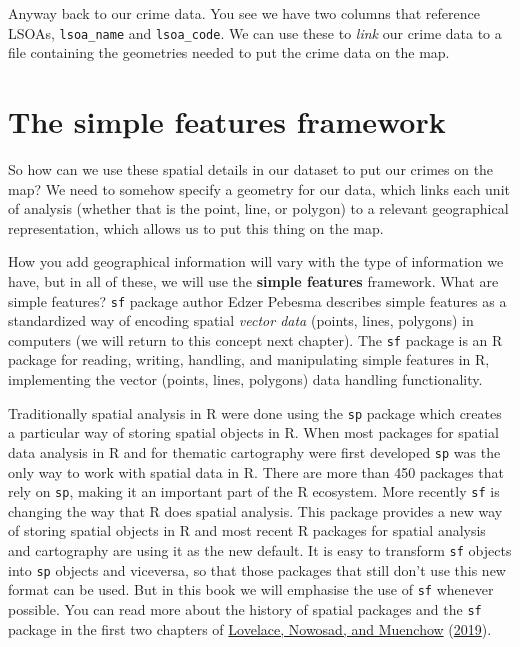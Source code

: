 \documentclass[
]{book}
\begin{document}
Anyway back to our crime data. You see we have two columns that reference LSOAs, \texttt{lsoa\_name} and \texttt{lsoa\_code}. We can use these to \emph{link} our crime data to a file containing the geometries needed to put the crime data on the map.

\hypertarget{the-simple-features-framework}{%
\section{The simple features framework}\label{the-simple-features-framework}}

So how can we use these spatial details in our dataset to put our crimes on the map? We need to somehow specify a geometry for our data, which links each unit of analysis (whether that is the point, line, or polygon) to a relevant geographical representation, which allows us to put this thing on the map.

How you add geographical information will vary with the type of information we have, but in all of these, we will use the \textbf{simple features} framework. What are simple features? \texttt{sf} package author Edzer Pebesma describes simple features as a standardized way of encoding spatial \emph{vector data} (points, lines, polygons) in computers (we will return to this concept next chapter). The \texttt{sf} package is an R package for reading, writing, handling, and manipulating simple features in R, implementing the vector (points, lines, polygons) data handling functionality.

Traditionally spatial analysis in R were done using the \texttt{sp} package which creates a particular way of storing spatial objects in R. When most packages for spatial data analysis in R and for thematic cartography were first developed \texttt{sp} was the only way to work with spatial data in R. There are more than 450 packages that rely on \texttt{sp}, making it an important part of the R ecosystem. More recently \texttt{sf} is changing the way that R does spatial analysis. This package provides a new way of storing spatial objects in R and most recent R packages for spatial analysis and cartography are using it as the new default. It is easy to transform \texttt{sf} objects into \texttt{sp} objects and viceversa, so that those packages that still don't use this new format can be used. But in this book we will emphasise the use of \texttt{sf} whenever possible. You can read more about the history of spatial packages and the \texttt{sf} package in the first two chapters of \protect\hyperlink{ref-Lovelace_2019}{Lovelace, Nowosad, and Muenchow} (\protect\hyperlink{ref-Lovelace_2019}{2019}).
\end{document}
